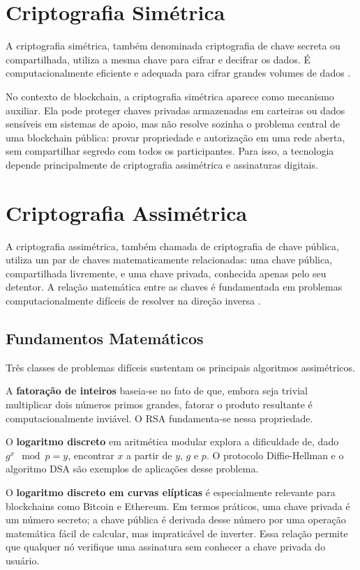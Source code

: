 \documentclass[12pt,a4paper]{report}
\begin{document}
\section{Criptografia Simétrica}

A criptografia simétrica, também denominada criptografia de chave secreta ou compartilhada, utiliza a mesma chave para cifrar e decifrar os dados. É computacionalmente eficiente e adequada para cifrar grandes volumes de dados \cite{Bashir2023}.

No contexto de blockchain, a criptografia simétrica aparece como mecanismo auxiliar. Ela pode proteger chaves privadas armazenadas em carteiras ou dados sensíveis em sistemas de apoio, mas não resolve sozinha o problema central de uma blockchain pública: provar propriedade e autorização em uma rede aberta, sem compartilhar segredo com todos os participantes. Para isso, a tecnologia depende principalmente de criptografia assimétrica e assinaturas digitais.

\section{Criptografia Assimétrica}

A criptografia assimétrica, também chamada de criptografia de chave pública, utiliza um par de chaves matematicamente relacionadas: uma chave pública, compartilhada livremente, e uma chave privada, conhecida apenas pelo seu detentor. A relação matemática entre as chaves é fundamentada em problemas computacionalmente difíceis de resolver na direção inversa \cite{Bashir2023}.

\subsection{Fundamentos Matemáticos}

Três classes de problemas difíceis sustentam os principais algoritmos assimétricos.

A \textbf{fatoração de inteiros} baseia-se no fato de que, embora seja trivial multiplicar dois números primos grandes, fatorar o produto resultante é computacionalmente inviável. O RSA fundamenta-se nessa propriedade.

O \textbf{logaritmo discreto} em aritmética modular explora a dificuldade de, dado $g^x \mod p = y$, encontrar $x$ a partir de $y$, $g$ e $p$. O protocolo Diffie-Hellman e o algoritmo DSA são exemplos de aplicações desse problema.

O \textbf{logaritmo discreto em curvas elípticas} é especialmente relevante para blockchains como Bitcoin e Ethereum. Em termos práticos, uma chave privada é um número secreto; a chave pública é derivada desse número por uma operação matemática fácil de calcular, mas impraticável de inverter. Essa relação permite que qualquer nó verifique uma assinatura sem conhecer a chave privada do usuário.
\end{document}
